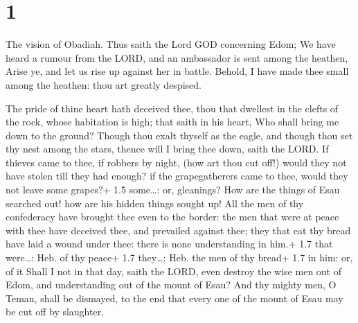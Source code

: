\hypertarget{section}{%
\section{1}\label{section}}

 The vision of Obadiah. Thus saith the Lord GOD concerning
Edom; We have heard a rumour from the LORD, and an ambassador is sent
among the heathen, Arise ye, and let us rise up against her in battle.
 Behold, I have made thee small among the heathen: thou art
greatly despised.

 The pride of thine heart hath deceived thee, thou that
dwellest in the clefts of the rock, whose habitation is high; that saith
in his heart, Who shall bring me down to the ground?  Though
thou exalt thyself as the eagle, and though thou set thy nest among the
stars, thence will I bring thee down, saith the LORD.  If
thieves came to thee, if robbers by night, (how art thou cut off!) would
they not have stolen till they had enough? if the grapegatherers came to
thee, would they not leave some grapes?+ 1.5 some\ldots: or, gleanings?
 How are the things of Esau searched out! how are his hidden
things sought up!  All the men of thy confederacy have
brought thee even to the border: the men that were at peace with thee
have deceived thee, and prevailed against thee; they that eat thy bread
have laid a wound under thee: there is none understanding in him.+ 1.7
that were\ldots: Heb. of thy peace+ 1.7 they\ldots: Heb. the men of thy
bread+ 1.7 in him: or, of it  Shall I not in that day, saith
the LORD, even destroy the wise men out of Edom, and understanding out
of the mount of Esau?  And thy mighty men, O Teman, shall be
dismayed, to the end that every one of the mount of Esau may be cut off
by slaughter.

